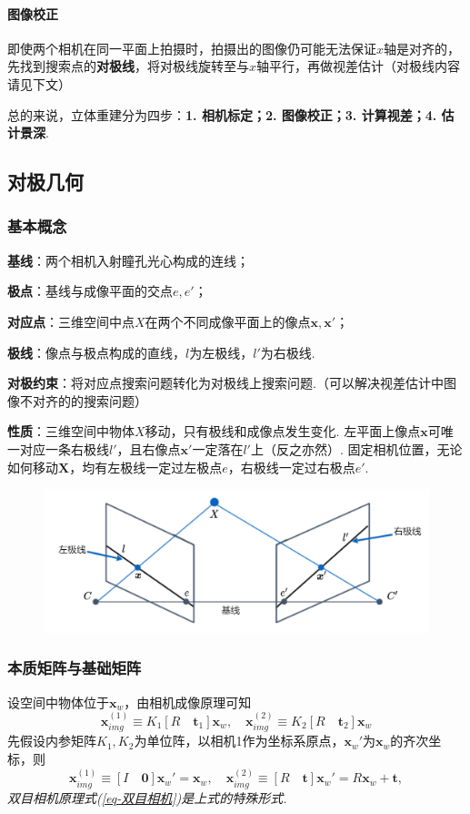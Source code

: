 \documentclass[12pt, a4paper, oneside]{ctexart}
\numberwithin{equation}{section}  %
\theoremstyle{definition}
\def\bd{\boldsymbol}        %
\def\del{\vspace{-1.5ex}}   %
\begin{document}
\paragraph{图像校正}即使两个相机在同一平面上拍摄时，拍摄出的图像仍可能无法保证$x$轴是对齐的，
先找到搜索点的\textbf{对极线}，将对极线旋转至与$x$轴平行，再做视差估计（对极线内容请见下文）

总的来说，立体重建分为四步：\textbf{1. 相机标定；2. 图像校正；3. 计算视差；4. 估计景深}.
\subsection{对极几何}
\subsubsection{基本概念}
\textbf{基线}：两个相机入射瞳孔光心构成的连线；\par
\textbf{极点}：基线与成像平面的交点$e,e'$；\par
\textbf{对应点}：三维空间中点$X$在两个不同成像平面上的像点$\bd{x},\bd{x}'$；\par
\textbf{极线}：像点与极点构成的直线，$l$为左极线，$l'$为右极线.\par
\textbf{对极约束}：将对应点搜索问题转化为对极线上搜索问题.（可以解决视差估计中图像不对齐的的搜索问题）\par
\textbf{性质}：三维空间中物体$X$移动，只有极线和成像点发生变化. 左平面上像点$\bd{x}$可唯一对应一条右极线$l'$，且右像点$\bd{x}'$一定落在$l'$上（反之亦然）.
固定相机位置，无论如何移动$\bd{X}$，均有左极线一定过左极点$e$，右极线一定过右极点$e'$.\del
\begin{figure}[htbp]
    \centering
    \includegraphics[scale=0.35]{对极几何.png}
\end{figure}
\subsubsection{本质矩阵与基础矩阵}  %
设空间中物体位于$\bd{x}_w$，由相机成像原理可知
\begin{equation*}
    \bd{x}^{(1)}_{img}\equiv K_1[R\quad \bd{t}_1]\bd{x}_w,\quad
    \bd{x}^{(2)}_{img}\equiv K_2[R\quad \bd{t}_2]\bd{x}_w
\end{equation*}
先假设内参矩阵$K_1,K_2$为单位阵，以相机1作为坐标系原点，$\bd{x}_w'$为$\bd{x}_w$的齐次坐标，则
\begin{equation*}
    \bd{x}^{(1)}_{img}\equiv [I\quad \bd{0}]\bd{x}_w' = \bd{x}_w,\quad \bd{x}^{(2)}_{img}\equiv [R\quad \bd{t}]\bd{x}_w'=R\bd{x}_w+\bd{t},
\end{equation*}
\textit{双目相机原理式(\ref{eq-双目相机})是上式的特殊形式.}
\end{document}
